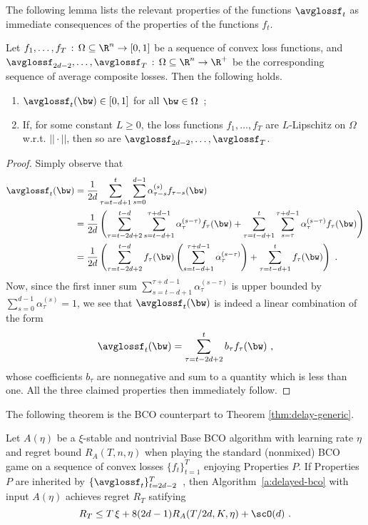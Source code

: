 The following lemma lists the relevant properties of the functions $\avglossf_t$ as immediate consequences of the properties of the functions $f_t$.
%
\begin{proposition}\label{l:propcomposite}
Let $f_1,\ldots, f_T\,:\,\Omega \subseteq \R^n \to [0,1]$ be a sequence of convex loss functions, and $\avglossf_{2d-2}, \ldots, \avglossf_T \,:\,\Omega \subseteq \R^n \rightarrow \R^+$ be the corresponding sequence of average composite losses. Then the following holds.
\begin{enumerate}[topsep=0pt,parsep=0pt,itemsep=0pt]
\item
$
\avglossf_{t}(\bw) \in [0,1]
$ for all $\bw \in \Omega$~;
\item If, for some constant $L \geq 0$, the loss functions $f_1,\ldots, f_T$ are $L$-Lipschitz on $\Omega$ w.r.t. $||\cdot||$, then so are $\avglossf_{2d-2},\ldots, \avglossf_T$.
\end{enumerate}
\end{proposition}
\begin{proof}
Simply observe that 
%
\begin{align*}
\avglossf_t(\bw) 
&= \frac{1}{2d}\sum_{\tau=t-d+1}^t \sum_{s=0}^{d-1} \alpha_{\tau-s}^{(s)}f_{\tau-s}(\bw)\\
&= \frac{1}{2d}
    \left(
    \sum_{\tau=t-2d+2}^{t-d} \sum_{s=t-d+1}^{\tau+d-1} \alpha_{\tau}^{(s-\tau)}f_{\tau}(\bw)
    + 
    \sum_{\tau=t-d+1}^{t} \sum_{s=\tau}^{\tau+d-1} \alpha_{\tau}^{(s-\tau)}f_{\tau}(\bw)
    \right)\\
&= \frac{1}{2d}
    \left(
    \sum_{\tau=t-2d+2}^{t-d} f_{\tau}(\bw) \left(\sum_{s=t-d+1}^{\tau+d-1} \alpha_{\tau}^{(s-\tau)}\right)
    + 
    \sum_{\tau=t-d+1}^{t} f_{\tau}(\bw)
    \right)~. 
\end{align*}
%
Now, since the first inner sum $\sum_{s=t-d+1}^{\tau+d-1} \alpha_{\tau}^{(s-\tau)}$ is upper bounded by $\sum_{s=0}^{d-1} \alpha_{\tau}^{(s)} = 1$, we
see that $\avglossf_t(\bw)$ is indeed a linear combination of the form
%
\[
\avglossf_t(\bw) = \sum_{\tau=t-2d+2}^{t} b_{\tau} f_{\tau}(\bw)~,
\]
%
whose coefficients $b_{\tau}$ are nonnegative and sum to a quantity which is less than one. All the three claimed properties then immediately follow.
%
\end{proof}
%
The following theorem is the BCO counterpart to Theorem \ref{thm:delay-generic}.
%
\begin{theorem}\label{thm:convex}
Let $A(\eta)$ be a $\xi$-stable and nontrivial Base BCO algorithm with learning rate $\eta$ and regret bound
$R_A(T,n,\eta)$ when playing the standard (nonmixed) BCO game on a sequence of convex losses $\{f_t\}_{t=1}^T$ enjoying Properties $P$.
If Properties $P$ are inherited by $\{\avglossf_t\}_{t=2d-2}^T$~, then Algorithm~\ref{a:delayed-bco} with input $A(\eta)$ achieves regret $R_T$ satifying
\[
R_T 
\le 
T\,\xi + 8(2d-1)R_A(T/2d,K,\eta)+\scO(d)~.
\]
\end{theorem}
